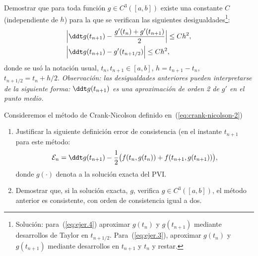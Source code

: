 \begin{EjerciciosPropuestos}
  \begin{problema}
    Demostrar que para toda función $g\in C^3([a,b])$ existe una
    constante $C$ (independiente de $h$) para la que se verifican las
    siguientes desigualdades\footnote{Solución: para~(\ref{eq:ejer.4}) aproximar
      $g(t_{n})$ y $g(t_{n+1})$ mediante desarrollos de Taylor en
      $t_{n+1/2}$. Para~(\ref{eq:ejer.3}), aproximar $g(t_n)$ y
      $g(t_{n+1})$ mediante desarrollos en $t_{n+1}$ y $t_n$ y
      restar.}:
    \begin{align}
      \label{eq:ejer.3}
      \Big| \ddt g(t_{n+1}) &- \frac{g'(t_{n})+ g'(t_{n+1})}2 \Big| \le C h^2,
      \\
      \Big| \ddt g(t_{n+1}) &- g'(t_{n+1/2}) \Big| \le C h^2,
      \label{eq:ejer.4}
    \end{align}
    donde se usó la notación usual, $t_n, t_{n+1}\in [a,b]$,
    $h=t_{n+1}-t_n$, $t_{n+1/2}=t_{n}+h/2$.  \textit{Observación: las
      desigualdades anteriores pueden interpretarse de la siguiente
      forma: $\ddt g(t_{n+1})$ es una aproximación de orden 2 de $g'$
      en el punto medio.}
  \end{problema}

  \begin{problema}
    Consideremos el método de Crank-Nicolson definido en~(\ref{eq:crank-nicolson-2})
    \begin{enumerate}
    \item Justificar la siguiente definición error de consistencia (en
      el instante $t_{n+1}$ para este método:
      \begin{equation*}
        \errCons_n = \ddt g(t_{n+1}) - \frac 12 \big( f(t_n, g(t_n)) + f(t_{n+1},g(t_{n+1}))\big),
      \end{equation*}
      donde $g(\cdot)$ denota a la solución exacta del PVI.
    \item Demostrar que, si la solución exacta, $g$, verifica
      $g\in C^3([a,b])$, el método anterior es consistente, con orden
      de consistencia igual a dos.
    \end{enumerate}
  \end{problema}


\end{EjerciciosPropuestos}
